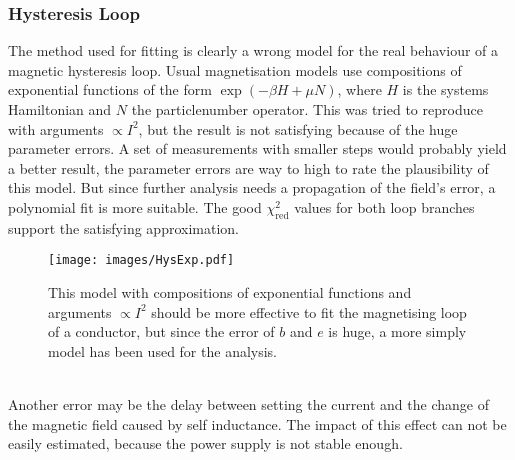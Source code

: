 \subsubsection{Hysteresis Loop}
The method used for fitting is clearly a wrong model for the real behaviour of a magnetic hysteresis loop. 
Usual magnetisation models use compositions of exponential functions of the form $\exp(-\beta H + \mu N)$, where $H$ is the systems Hamiltonian and $N$ the particlenumber operator.
This was tried to reproduce with arguments $\propto I^2$, but the result is not satisfying because of the huge parameter errors.
A set of measurements with smaller steps would probably yield a better result, the parameter errors are way to high to rate the plausibility of this model.
But since further analysis needs a propagation of the field's error, a polynomial fit is more suitable.
The good $\chi^2_{\text{red}}$ values for both loop branches support the satisfying approximation.
\begin{figure}[ht]
	\centering
	\texttt{[image: images/HysExp.pdf]}
	\caption[Hysteresis Loop with a More Realistic Fit Model]{This model with compositions of exponential functions and arguments $\propto I^2$ should be more effective to fit the magnetising loop of a conductor, but since the error of $b$ and $e$ is huge, a more simply model has been used for the analysis.}
\end{figure}\\
Another error may be the delay between setting the current and the change of the magnetic field caused by self inductance.
The impact of this effect can not be easily estimated, because the power supply is not stable enough.
